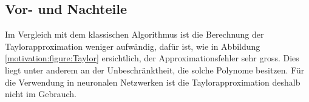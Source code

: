 \subsection{Vor- und Nachteile}
Im Vergleich mit dem klassischen Algorithmus ist die Berechnung der Taylorapproximation weniger aufwändig, dafür ist, wie in Abbildung \ref{motivation:figure:Taylor} ersichtlich, der Approximationsfehler sehr gross. Dies liegt unter anderem an der Unbeschränktheit, die solche Polynome besitzen. Für die Verwendung in neuronalen Netzwerken ist die Taylorapproximation deshalb nicht im Gebrauch.
